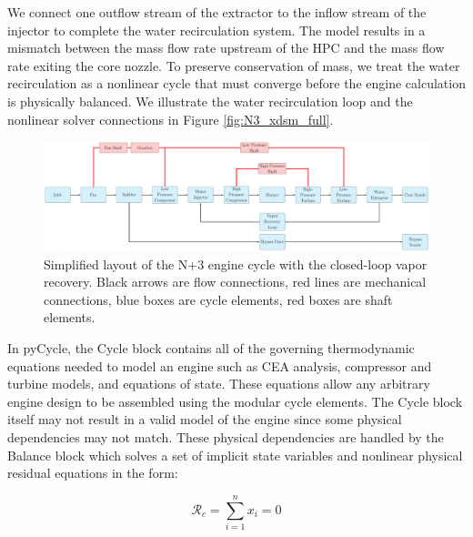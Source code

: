 \documentclass[conf]{new-aiaa}
\begin{document}
We connect one outflow stream of the extractor to the inflow stream of the injector to complete the water recirculation system.
The model results in a mismatch between the mass flow rate upstream of the HPC and the mass flow rate exiting the core nozzle.
To preserve conservation of mass, we treat the water recirculation as a nonlinear cycle that must converge before the engine calculation is physically balanced.
We illustrate the water recirculation loop and the nonlinear solver connections in Figure \ref{fig:N3_xdsm_full}.

\begin{figure}[hbt!]
    \centering
    \includegraphics[width=1.0\textwidth]{N3_CLVR_cycle.pdf}
    \caption{
        Simplified layout of the N+3 engine cycle with the closed-loop vapor recovery.
        Black arrows are flow connections, red lines are mechanical connections, blue boxes are cycle elements, red boxes are shaft elements.
    }
    \label{fig:n3_clvr}
\end{figure}

In pyCycle, the Cycle block contains all of the governing thermodynamic equations needed to model an engine such as CEA analysis, compressor and turbine models, and equations of state.
These equations allow any arbitrary engine design to be assembled using the modular cycle elements.
The Cycle block itself may not result in a valid model of the engine since some physical dependencies may not match.
These physical dependencies are handled by the Balance block which solves a set of implicit state variables and nonlinear physical residual equations in the form:

\begin{equation}
    \mathcal{R}_c = \sum_{i=1}^{n} x_i = 0
\end{equation}
\end{document}
